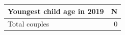 
\begin{tabular}{lr}
\toprule
Youngest child age in 2019 & N\\
\midrule
Total couples & 0\\
\bottomrule
\end{tabular}
